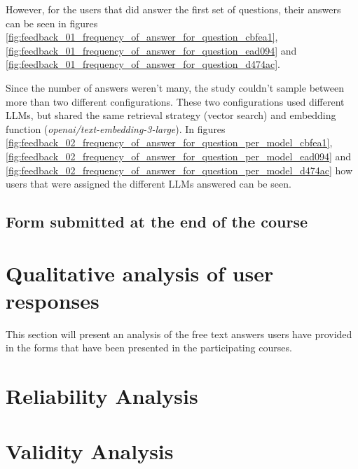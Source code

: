 However, for the users that did answer the first set of questions, their answers can be seen in figures \ref{fig:feedback_01_frequency_of_answer_for_question_cbfea1}, \ref{fig:feedback_01_frequency_of_answer_for_question_ead094} and \ref{fig:feedback_01_frequency_of_answer_for_question_d474ac}.











Since the number of answers weren't many, the study couldn’t sample between more than two different configurations. These two configurations used different \gls{LLM}s, but shared the same retrieval strategy (vector search) and embedding function (\textit{openai/text-embedding-3-large}). In figures \ref{fig:feedback_02_frequency_of_answer_for_question_per_model_cbfea1}, \ref{fig:feedback_02_frequency_of_answer_for_question_per_model_ead094} and \ref{fig:feedback_02_frequency_of_answer_for_question_per_model_d474ac} how users that were assigned the different \gls{LLM}s answered can be seen.











\subsection{Form submitted at the end of the course}




\section{Qualitative analysis of user responses}
\label{sec:qualitative_analysis_of_user_responses}


This section will present an analysis of the free text answers users have provided in the forms that have been presented in the participating courses.






\section{Reliability Analysis}




\section{Validity Analysis}




\cleardoublepage